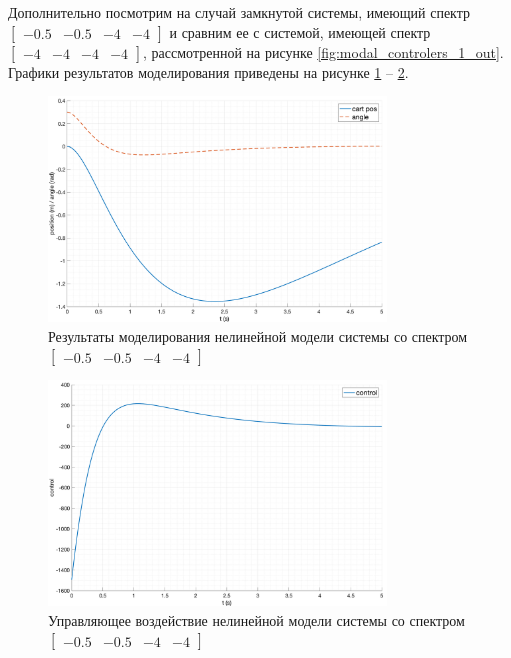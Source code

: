 \FloatBarrier
Дополнительно посмотрим на случай замкнутой системы, имеющий спектр $\begin{bmatrix}-0.5 & -0.5 & -4 &- 4\end{bmatrix}$
и сравним ее с системой, имеющей спектр $\begin{bmatrix}-4 & -4 & -4 &- 4\end{bmatrix}$, рассмотренной на рисунке \ref{fig:modal_controlers_1_out}.
Графики результатов моделирования приведены на рисунке \ref{fig:modal_controlers_5_out} -- \ref{fig:modal_controlers_5_u}. 
\begin{figure}[ht!]
    \centering
    \includegraphics[width=0.8\textwidth]{media/plots/modal_controllers/modal_control_out_5.png}
    \caption{Результаты моделирования нелинейной модели системы со спектром $\begin{bmatrix}-0.5 & -0.5 & -4 &- 4\end{bmatrix}$}
    \label{fig:modal_controlers_5_out}
\end{figure}
\begin{figure}[ht!]
    \centering
    \includegraphics[width=0.8\textwidth]{media/plots/modal_controllers/modal_control_u_5.png}
    \caption{Управляющее воздействие нелинейной модели системы со спектром $\begin{bmatrix}-0.5 & -0.5 & -4 &- 4\end{bmatrix}$}
    \label{fig:modal_controlers_5_u}
\end{figure}
